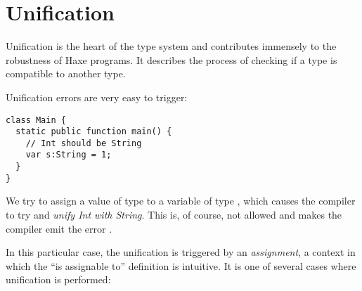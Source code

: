 \section{Unification}
\label{type-system-unification}


Unification is the heart of the type system and contributes immensely to the robustness of Haxe programs. It describes the process of checking if a type is compatible to another type.


Unification errors are very easy to trigger:

\begin{lstlisting}
class Main {
  static public function main() {
    // Int should be String
    var s:String = 1;
  }
}
\end{lstlisting}
We try to assign a value of type  to a variable of type , which causes the compiler to try and \emph{unify Int with String}. This is, of course, not allowed and makes the compiler emit the error .

In this particular case, the unification is triggered by an \emph{assignment}, a context in which the ``is assignable to'' definition is intuitive. It is one of several cases where unification is performed:

